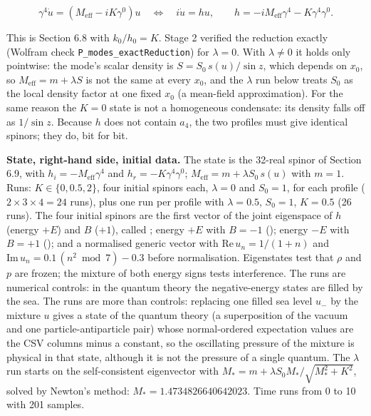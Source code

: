 \documentclass[11pt]{article}
\begin{document}
\[
\gamma^4\dot u=(M_{\mathrm{eff}}-iK\gamma^0)u\quad\Longleftrightarrow\quad i\dot u=hu,\qquad h=-iM_{\mathrm{eff}}\gamma^4-K\gamma^4\gamma^0 .
\]

This is Section 6.8 with $k_0/h_0=K$. Stage 2 verified the reduction exactly (Wolfram check \texttt{P\_modes\_\allowbreak{}exactRed\allowbreak{}uction}) for $\lambda=0$. With $\lambda\ne0$ it holds only pointwise: the mode's scalar density is $S=S_0\,s(u)/\sin z$, which depends on $x_0$, so $M_{\mathrm{eff}}=m+\lambda S$ is not the same at every $x_0$, and the $\lambda$ run below treats $S_0$ as the local density factor at one fixed $x_0$ (a mean-field approximation). For the same reason the $K=0$ state is not a homogeneous condensate: its density falls off as $1/\sin z$. Because $h$ does not contain $a_4$, the two profiles must give identical spinors; they do, bit for bit.

\textbf{State, right-hand side, initial data.} The state is the 32-real spinor of Section 6.9, with $h_i=-M_{\mathrm{eff}}\gamma^4$ and $h_r=-K\gamma^4\gamma^0$; $M_{\mathrm{eff}}=m+\lambda S_0\,s(u)$ with $m=1$. Runs: $K\in\{0,0.5,2\}$, four initial spinors each, $\lambda=0$ and $S_0=1$, for each profile ($2\times3\times4=24$ runs), plus one run per profile with $\lambda=0.5$, $S_0=1$, $K=0.5$ (26 runs). The four initial spinors are the first vector of the joint eigenspace of $h$ (energy $+E$) and $B$ ($+1$), called \texttt{}; energy $+E$ with $B=-1$ (\texttt{}); energy $-E$ with $B=+1$ (\texttt{}); and a normalised generic vector \texttt{} with $\mathrm{Re}\,u_n=1/(1+n)$ and $\mathrm{Im}\,u_n=0.1\,(n^2\bmod7)-0.3$ before normalisation. Eigenstates test that $\rho$ and $p$ are frozen; the mixture of both energy signs tests interference. The \texttt{} runs are numerical controls: in the quantum theory the negative-energy states are filled by the sea. The \texttt{} runs are more than controls: replacing one filled sea level $u_-$ by the mixture $u$ gives a state of the quantum theory (a superposition of the vacuum and one particle-antiparticle pair) whose normal-ordered expectation values are the CSV columns minus a constant, so the oscillating pressure of the mixture is physical in that state, although it is not the pressure of a single quantum. The $\lambda$ run starts on the self-consistent eigenvector with $M_*=m+\lambda S_0M_*/\sqrt{M_*^2+K^2}$, solved by Newton's method: $M_*=1.4734826640642023$. Time runs from 0 to 10 with 201 samples.
\end{document}
